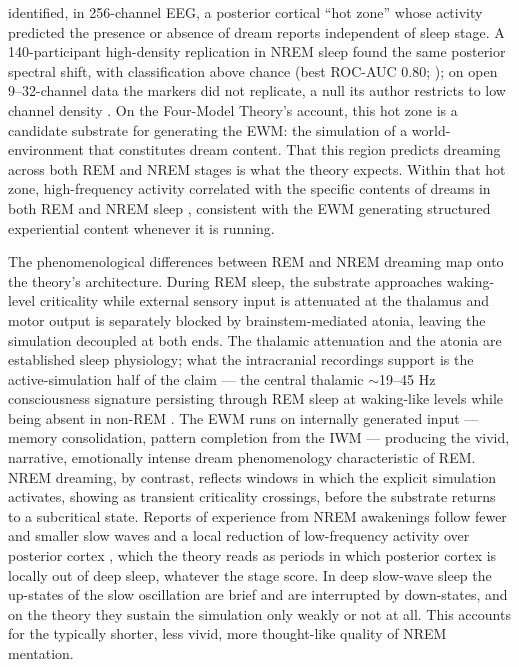 \documentclass[12pt]{article}
\begin{document}
{\citet{Siclari2017} identified, in 256-channel EEG, a posterior cortical ``hot zone'' whose activity predicted the presence or absence of dream reports independent of sleep stage. A 140-participant high-density replication in NREM sleep found the same posterior spectral shift, with classification above chance (best ROC-AUC 0.80; \citealp{Selte2026}); on open 9--32-channel data the markers did not replicate, a null its author restricts to low channel density \citep{Wu2026}. On the Four-Model Theory's account, this hot zone is a candidate substrate for generating the EWM: the simulation of a world-environment that constitutes dream content. That this region predicts dreaming across both REM and NREM stages is what the theory expects. Within that hot zone, high-frequency activity correlated with the specific contents of dreams in both REM and NREM sleep \citep{Siclari2017}, consistent with the EWM generating structured experiential content whenever it is running.

The phenomenological differences between REM and NREM dreaming map onto the theory's architecture. During REM sleep, the substrate approaches waking-level criticality while external sensory input is attenuated at the thalamus and motor output is separately blocked by brainstem-mediated atonia, leaving the simulation decoupled at both ends. The thalamic attenuation and the atonia are established sleep physiology; what the intracranial recordings support is the active-simulation half of the claim --- the central thalamic $\sim$19--45 Hz consciousness signature persisting through REM sleep at waking-like levels while being absent in non-REM \citep{Chowdhury2026}. The EWM runs on internally generated input --- memory consolidation, pattern completion from the IWM --- producing the vivid, narrative, emotionally intense dream phenomenology characteristic of REM. NREM dreaming, by contrast, reflects windows in which the explicit simulation activates, showing as transient criticality crossings, before the substrate returns to a subcritical state. Reports of experience from NREM awakenings follow fewer and smaller slow waves \citep{Siclari2018} and a local reduction of low-frequency activity over posterior cortex \citep{Siclari2017}, which the theory reads as periods in which posterior cortex is locally out of deep sleep, whatever the stage score. In deep slow-wave sleep the up-states of the slow oscillation \citep{Steriade2001} are brief and are interrupted by down-states, and on the theory they sustain the simulation only weakly or not at all. This accounts for the typically shorter, less vivid, more thought-like quality of NREM mentation.

}
\end{document}
